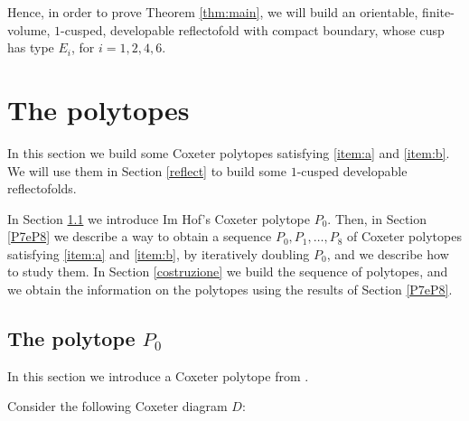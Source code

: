 \documentclass{amsart}
\theoremstyle{definition}
\theoremstyle{remark}
\begin{document}

Hence, in order to prove Theorem \ref{thm:main}, we will build an orientable, finite-volume, $1$-cusped, developable reflectofold with compact boundary, whose cusp has type $E_i$, for $i=1,2,4,6$.

\section{The polytopes} \label{sec:proof}

In this section we build some Coxeter polytopes satisfying \ref{item:a} and \ref{item:b}. We will use them in Section \ref{reflect} to build some $1$-cusped developable reflectofolds.

In Section \ref{P0} we introduce Im Hof's Coxeter polytope $P_0$. Then, in Section \ref{P7eP8} we describe a way to obtain a sequence $P_0,P_1,\dots,P_8$ of Coxeter polytopes satisfying \ref{item:a} and \ref{item:b}, by iteratively doubling $P_0$, and we describe how to study them. In Section \ref{costruzione} we build the sequence of polytopes, and we obtain the information on the polytopes using the results of Section \ref{P7eP8}.

\subsection{The polytope \texorpdfstring{$P_0$}{P\_0}}\label{P0}
In this section we introduce a Coxeter polytope from \cite{IH}.

Consider the following Coxeter diagram $D$:
\end{document}
